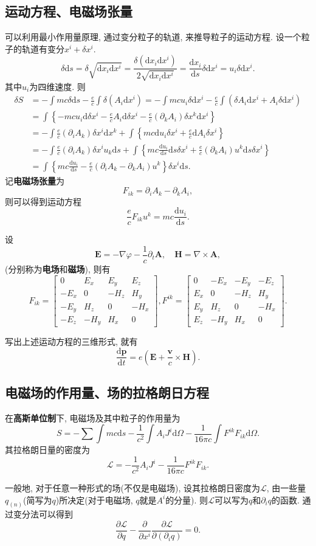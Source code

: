\documentclass{article}
\newcommand\del{\partial}
\newcommand\bo[1]{\boldsymbol{#1}}
\renewcommand\d{\mathrm{d}}
\begin{document}
\subsection{运动方程、电磁场张量}
可以利用最小作用量原理, 通过变分粒子的轨道, 来推导粒子的运动方程. 设一个粒子的轨道有变分$x^i+\delta x^i$.
\[\delta\d s=\delta\sqrt{\d x_i\d x^i}=\frac{\delta(\d x_i\d x^i)}{2\sqrt{\d x_i\d x^i}}=\frac{\d x_i}{\d s}\delta\d x^i=u_i\delta\d x^i.\]
其中$u_i$为四维速度. 则
\begin{align*}
    \delta S&=-\int mc\delta\d s-\frac{e}{c}\int\delta(A_i\d x^i)=-\int mcu_i\delta\d x^i-\frac{e}{c}\int\left(\delta A_i\d x^i+A_i\delta\d x^i\right)\\
    &=\int\left\{-mcu_i\d\delta x^i-\frac{e}{c}A_i\d\delta x^i-\frac{e}{c}\left(\del_kA_i\right)\delta x^k\d x^i\right\}\\
    &=-\int\frac{e}{c}\left(\del_iA_k\right)\delta x^i\d x^k+\int\left\{mc\d u_i\delta x^i+\frac{e}{c}\d A_i\delta x^i\right\}\\
    &=-\int\frac{e}{c}\left(\del_iA_k\right)\delta x^i u_k\d s+\int\left\{mc\frac{\d u_i}{\d s}\d s\delta x^i+\frac{e}{c}\left(\del_k A_i\right)u^k\d s\delta x^i\right\}\\
    &=\int\left\{mc\frac{\d u_i}{\d s}-\frac{e}{c}\left(\del_iA_k-\del_kA_i\right)u^k\right\}\delta x^i\d s.
\end{align*}
记\textbf{电磁场张量}为
\[F_{ik}=\del_i A_k-\del_k A_i,\]
则可以得到运动方程
\[\boxed{\frac{e}{c}F_{ik}u^k=mc\frac{\d u_i}{\d s}.}\]\par 
设
\[\bo{E}=-\nabla\varphi-\frac{1}{c}\del_t\bo{A},\quad\bo{H}=\nabla\times\bo{A},\]
(分别称为\textbf{电场}和\textbf{磁场}), 则有
\[F_{ik}=\begin{bmatrix}0&E_x&E_y&E_z\\-E_x&0&-H_z&H_y\\-E_y&H_z&0&-H_x\\-E_z&-H_y&H_x&0\end{bmatrix},
 F^{ik}=\begin{bmatrix}0&-E_x&-E_y&-E_z\\E_x&0&-H_z&H_y\\E_y&H_z&0&-H_x\\E_z&-H_y&H_x&0\end{bmatrix}.\]\par 
写出上述运动方程的三维形式, 就有
\[\boxed{\frac{\d\bo{p}}{\d t}=e\left(\bo{E}+\frac{\bo{v}}{c}\times\bo{H}\right).}\]

\subsection{电磁场的作用量、场的拉格朗日方程}
在\textbf{高斯单位制}下, 电磁场及其中粒子的作用量为
\[\boxed{S=-\sum\int mc\d s-\frac{1}{c^2}\int A_iJ^i\d\Omega-\frac{1}{16\pi c}\int F^{ik}F_{ik}\d\Omega.}\]
其拉格朗日量的密度为
\[\mathcal{L}=-\frac{1}{c^2}A_iJ^i-\frac{1}{16\pi c}F^{ik}F_{ik}.\]\par
一般地, 对于任意一种形式的场(不仅是电磁场), 设其拉格朗日密度为$\mathcal{L}$, 由一些量$q_{(n)}$(简写为$q$)所决定(对于电磁场, $q$就是$A^i$的分量). 则$\mathcal{L}$可以写为$q$和$\del_i q$的函数. 通过变分法可以得到
\[\frac{\del\mathcal{L}}{\del q}-\frac{\del}{\del x^i}\frac{\del\mathcal{L}}{\del(\del_iq)}=0.\]
\end{document}
